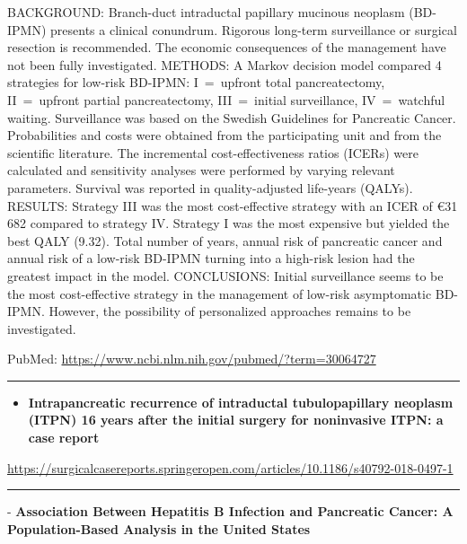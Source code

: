 \documentclass[]{article}
\providecommand{\tightlist}{%
  \setlength{\itemsep}{0pt}\setlength{\parskip}{0pt}}
\begin{document}
BACKGROUND: Branch-duct intraductal papillary mucinous neoplasm
(BD-IPMN) presents a clinical conundrum. Rigorous long-term surveillance
or surgical resection is recommended. The economic consequences of the
management have not been fully investigated. METHODS: A Markov decision
model compared 4 strategies for low-risk BD-IPMN: I~=~upfront total
pancreatectomy, II~=~upfront partial pancreatectomy, III~=~initial
surveillance, IV~=~watchful waiting. Surveillance was based on the
Swedish Guidelines for Pancreatic Cancer. Probabilities and costs were
obtained from the participating unit and from the scientific literature.
The incremental cost-effectiveness ratios (ICERs) were calculated and
sensitivity analyses were performed by varying relevant parameters.
Survival was reported in quality-adjusted life-years (QALYs). RESULTS:
Strategy III was the most cost-effective strategy with an ICER of €31
682 compared to strategy IV. Strategy I was the most expensive but
yielded the best QALY (9.32). Total number of years, annual risk of
pancreatic cancer and annual risk of a low-risk BD-IPMN turning into a
high-risk lesion had the greatest impact in the model. CONCLUSIONS:
Initial surveillance seems to be the most cost-effective strategy in the
management of low-risk asymptomatic BD-IPMN. However, the possibility of
personalized approaches remains to be investigated.

PubMed: \url{https://www.ncbi.nlm.nih.gov/pubmed/?term=30064727}

{}

{}

\begin{center}\rule{0.5\linewidth}{\linethickness}\end{center}

\begin{itemize}
\tightlist
\item
  \textbf{Intrapancreatic recurrence of intraductal tubulopapillary
  neoplasm (ITPN) 16 years after the initial surgery for noninvasive
  ITPN: a case report}
\end{itemize}

\url{https://surgicalcasereports.springeropen.com/articles/10.1186/s40792-018-0497-1}

\begin{center}\rule{0.5\linewidth}{\linethickness}\end{center}

 - \textbf{Association Between Hepatitis B Infection and Pancreatic
Cancer: A Population-Based Analysis in the United States}
\end{document}
